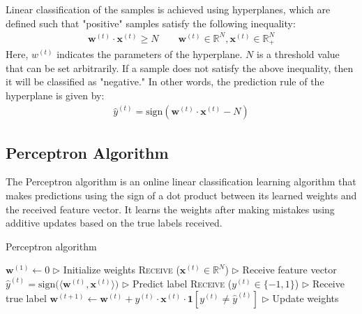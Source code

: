 \documentclass[11pt]{article}
\begin{document}
Linear classification of the samples is achieved using hyperplanes, which are defined such that "positive" samples satisfy the following inequality:
\begin{align}
    \boldsymbol{w}^{(t)} \cdot \boldsymbol{x}^{(t)} \geq N \quad\quad \boldsymbol{w}^{(t)} \in \mathbb{R}^N, \boldsymbol{x}^{(t)} \in \mathbb{R}_+^N
\end{align}
Here, $w^{(t)}$ indicates the parameters of the hyperplane. $N$ is a threshold value that can be set arbitrarily. If a sample does not satisfy the above inequality, then it will be classified as "negative." In other words, the prediction rule of the hyperplane is given by:
\begin{align}
    \hat{y}^{(t)} = \text{sign}(\boldsymbol{w}^{(t)} \cdot \boldsymbol{x}^{(t)} - N)    
\end{align}


        
\subsection{Perceptron Algorithm}
The Perceptron algorithm is an online linear classification learning algorithm that makes predictions using the sign of a dot product between its learned weights and the received feature vector. It learns the weights after making mistakes using additive updates based on the true labels received.  

\begin{algorithm}[H]
\caption{Perceptron algorithm}
\label{algo:perceptron}
\begin{algorithmic}[1]
\STATE $\textbf{w}^{(1)} \leftarrow 0$ \hfill $\triangleright$ Initialize weights
\STATE \textsc{Receive} ($\textbf{x}^{(t)}\in \mathbb{R}^N$) \hfill $\triangleright$ Receive feature vector
\STATE $\hat{y}^{(t)} = \text{sign}\Big(\langle \textbf{w}^{(t)}, \textbf{x}^{(t)}\rangle \Big)$ \hfill $\triangleright$ Predict label
\STATE \textsc{Receive} ($y^{(t)}\in\{-1, 1\}$) \hfill $\triangleright$ Receive true label
\STATE $\textbf{w}^{(t+1)}\leftarrow \textbf{w}^{(t)} + y^{(t)} \cdot \textbf{x}^{(t)} \cdot\textbf{1}[y^{(t)}\neq \hat{y}^{(t)}] $ \hfill $\triangleright$ Update weights
\ENDFOR
\end{algorithmic}
\end{algorithm}
\end{document}
